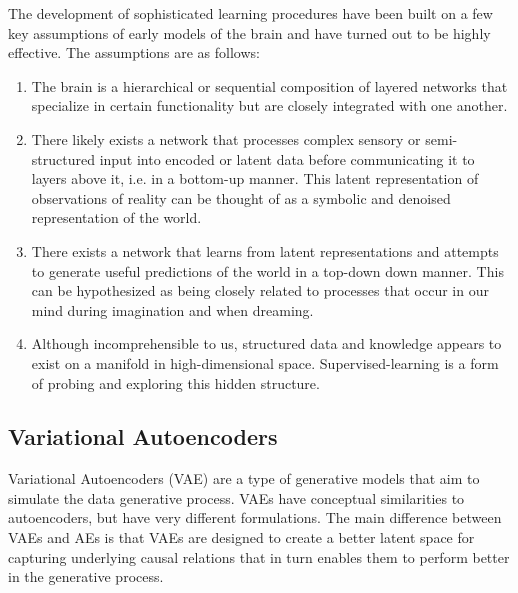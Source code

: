 \documentclass{article}
\begin{document}
The development of sophisticated learning procedures have been built on a few key assumptions of early models of the brain and have turned out to be highly effective. The assumptions are as follows:
\begin{enumerate}
    \item The brain is a hierarchical or sequential composition of layered networks that specialize in certain functionality but are closely integrated with one another.
    \item There likely exists a network that processes complex sensory or semi-structured input into encoded or latent data before communicating it to layers above it, i.e. in a bottom-up manner. This latent representation of observations of reality can be thought of as a symbolic and denoised representation of the world.
    \item There exists a network that learns from latent representations and attempts to generate useful predictions of the world in a top-down down manner. This can be hypothesized as being closely related to processes that occur in our mind during imagination and when dreaming.
    \item  Although incomprehensible to us, structured data and knowledge appears to exist on a manifold in high-dimensional space. Supervised-learning is a form of probing and exploring this hidden structure.
\end{enumerate}

\subsection{Variational Autoencoders}
Variational Autoencoders (VAE) are a type of generative models that aim to simulate the data generative process. VAEs have conceptual similarities to autoencoders, but have very different formulations. The main difference between VAEs and AEs is that VAEs are designed to create a better latent space for capturing underlying causal relations that in turn enables them to perform better in the generative process.
\end{document}
